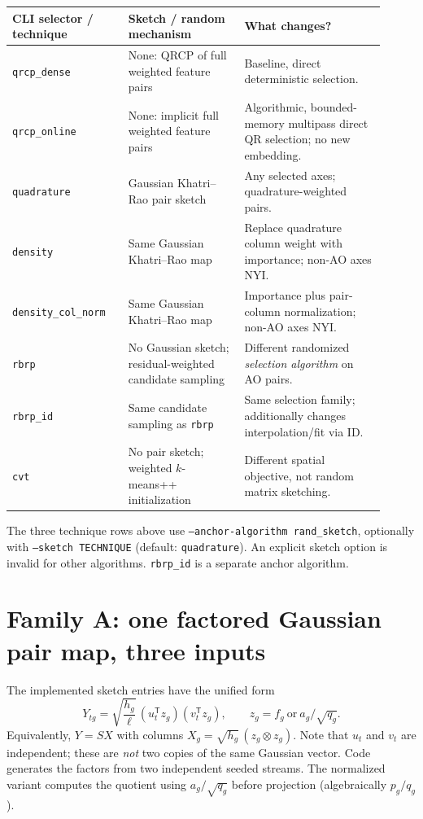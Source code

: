 \documentclass[10pt,a4paper]{article}
\newcommand{\code}[1]{\texttt{#1}}
\begin{document}
\small
\begin{longtable}{@{}p{0.28\linewidth}p{0.29\linewidth}p{0.34\linewidth}@{}}
\toprule
CLI selector / technique & Sketch / random mechanism & What changes? \\
\midrule\endhead
\code{qrcp\_dense} & None: QRCP of full weighted feature pairs & Baseline, direct deterministic selection. \\
\code{qrcp\_online} & None: implicit full weighted feature pairs & Algorithmic, bounded-memory multipass direct QR selection; no new embedding. \\
\code{quadrature} & Gaussian Khatri--Rao pair sketch & Any selected axes; quadrature-weighted pairs. \\
\code{density} & Same Gaussian Khatri--Rao map & Replace quadrature column weight with importance; non-AO axes NYI. \\
\code{density\_col\_norm} & Same Gaussian Khatri--Rao map & Importance plus pair-column normalization; non-AO axes NYI. \\
\code{rbrp} & No Gaussian sketch; residual-weighted candidate sampling & Different randomized \emph{selection algorithm} on AO pairs. \\
\code{rbrp\_id} & Same candidate sampling as \code{rbrp} & Same selection family; additionally changes interpolation/fit via ID. \\
\code{cvt} & No pair sketch; weighted $k$-means++ initialization & Different spatial objective, not random matrix sketching. \\
\bottomrule
\end{longtable}
\normalsize
The three technique rows above use
\code{--anchor-algorithm rand\_sketch}, optionally with
\code{--sketch TECHNIQUE} (default: \code{quadrature}). An explicit sketch
option is invalid for other algorithms. \code{rbrp\_id} is a separate anchor algorithm.

\section{Family A: one factored Gaussian pair map, three inputs}
The implemented sketch entries have the unified form
\begin{equation}
Y_{tg}=\sqrt{\frac{h_g}{\ell}}\,
 (u_t^\mathsf T z_g)(v_t^\mathsf T z_g),
\qquad z_g=f_g\ \text{or}\ a_g/\sqrt{q_g}.
\label{eq:family}
\end{equation}
Equivalently, $Y=S X$ with columns $X_g=\sqrt{h_g}\,(z_g\otimes z_g)$.
Note that $u_t$ and $v_t$ are independent; these are \emph{not} two copies
of the same Gaussian vector. Code generates the factors from two independent
seeded streams. The normalized variant computes the quotient using
$a_g/\sqrt{q_g}$ before projection (algebraically $p_g/q_g$).
\end{document}

